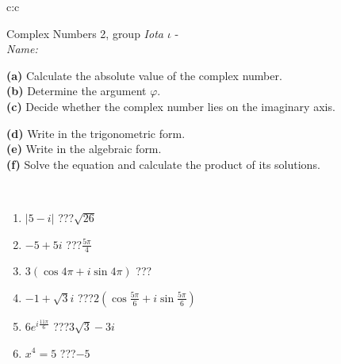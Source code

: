 \documentclass[10pt]{report}
\begin{document}
\newpage
\thispagestyle{empty}
\begin{tabular}{c:c}
\begin{minipage}[c][104.5mm][t]{0.5\linewidth}
\begin{center}
\vspace{5mm}
{\huge Complex Numbers 2, group \textit{Iota $\iota$} -}\\[5mm]
\textit{Name:}\phantom{xxxxxxxxxxxxxxxxxxxxxxxxxxxxxxxxxxxxxxxxxxxxxxxxxxxxxxxxxxxxxxxxx}\\[5mm]
\begin{minipage}{0.95\linewidth}
\begin{center}
{\small \begin{minipage}{0.44\textwidth} \raggedright
\textbf{(a)} Calculate the absolute value of the complex number. \\[1mm]
\textbf{(b)} Determine the argument \(\varphi\). \\[1mm]
\textbf{(c)} Decide whether the complex number lies on the imaginary axis. \end{minipage} \begin{minipage}{0.54\textwidth}
\textbf{(d)} Write in the trigonometric form. \\[1mm]
\textbf{(e)} Write in the algebraic form. \\[1mm]
\textbf{(f)} Solve the equation and calculate the product of its solutions.
\end{minipage}
}
\end{center}
\end{minipage}
\\[1mm]
\begin{minipage}{0.79\linewidth}
\begin{center}
\begin{varwidth}{\linewidth}
\setlength{\itemsep}{0pt}
\begin{enumerate}
\large
\item $|5-i|$\quad \dotfill\; ???\;\dotfill \quad $\sqrt{26}$
\item $-5+5i$\quad \dotfill\; ???\;\dotfill \quad $\frac{5\pi}{4}$
\item $3\left(\cos{4\pi}+i\sin{4\pi}\right)$\quad \dotfill\; ???\;\dotfill \quad {}
\item $-1+\sqrt{3}i$\quad \dotfill\; ???\;\dotfill \quad $2\left(\cos{\frac{5\pi}{6}}+i\sin{\frac{5\pi}{6}}\right)$
\item $6e^{i\frac{11\pi}{6}}$\quad \dotfill\; ???\;\dotfill \quad $3\sqrt{3}-3i$
\item $x^4=5$\quad \dotfill\; ???\;\dotfill \quad $-5$

\end{enumerate}
\end{varwidth}
\end{center}
\end{minipage}
\end{center}
\end{minipage}
\end{tabular}
\end{document}
